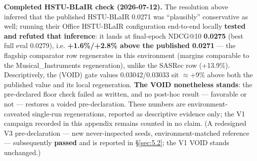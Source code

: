 \textbf{Completed HSTU-BLaIR check (2026-07-12).} The resolution above inferred that the published HSTU-BLaIR 0.0271 was ``plausibly'' conservative as well; running their Office HSTU-BLaIR configuration end-to-end locally \textbf{tested and refuted that inference}: it lands at final-epoch NDCG@10 \textbf{0.0275} (best full eval 0.0279), i.e. \textbf{+1.6\%/+2.8\% above the published 0.0271} --- the flagship comparator row regenerates in this environment (margins comparable to the Musical\_Instruments regeneration), unlike the SASRec row (+13.9\%). Descriptively, the (VOID) gate values 0.03042/0.03033 sit \ensuremath{\approx}+9\% above both the published value and its local regeneration. \textbf{The VOID nonetheless stands}: the pre-declared floor check failed as written, and no post-hoc result --- favorable or not --- restores a voided pre-declaration. These numbers are environment-caveated single-run regenerations, reported as descriptive evidence only; the V1 campaign recorded in this appendix remains counted in no claim. (A redesigned V3 pre-declaration --- new never-inspected seeds, environment-matched reference --- subsequently \textbf{passed} and is reported in \S\ref{sec:5.2}; the V1 VOID stands unchanged.)

